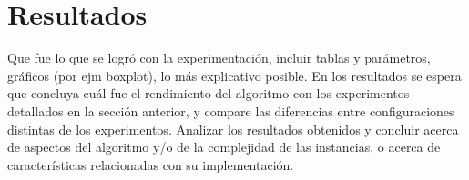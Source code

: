 \section{Resultados}

Que fue lo que se logró con la experimentación, incluir tablas y parámetros, gráficos (por ejm boxplot), lo más explicativo posible. En los resultados se espera que concluya cuál fue el rendimiento del algoritmo con los experimentos detallados en la sección anterior, y compare las diferencias entre configuraciones distintas de los experimentos. Analizar los resultados obtenidos y concluir acerca de aspectos del algoritmo y/o de la complejidad de las instancias, o acerca de características relacionadas con su implementación.
